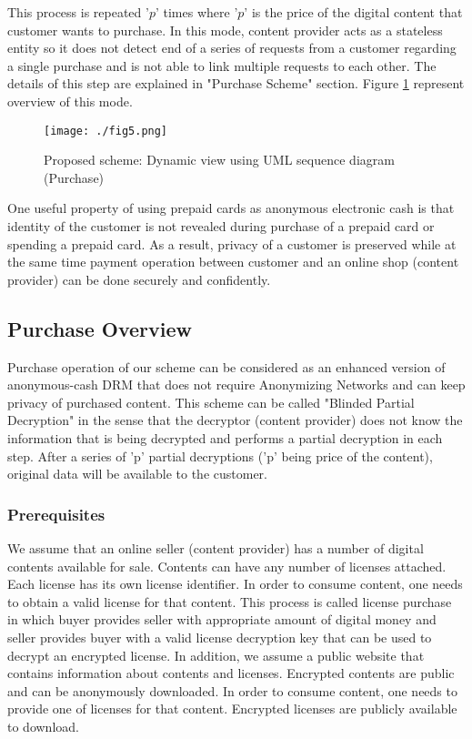 \documentclass[times]{secauth}
\begin{document}
This process is repeated '$p$' times where '$p$' is the price of the digital content that customer wants to purchase. In this mode, content provider acts as a stateless entity so it does not detect end of a series of requests from a customer regarding a single purchase and is not able to link multiple requests to each other. The details of this step are explained in "Purchase Scheme" section. Figure \ref{fig_dynamic} represent overview of this mode.

\begin{figure}
\centering
\texttt{[image: ./fig5.png]}
\caption{Proposed scheme: Dynamic view using UML sequence diagram (Purchase)}
\label{fig_dynamic}
\end{figure}

One useful property of using prepaid cards as anonymous electronic cash is that identity of the customer is not revealed during purchase of a prepaid card or spending a prepaid card. As a result, privacy of a customer is preserved while at the same time payment operation between customer and an online shop (content provider) can be done securely and confidently.

\subsection{Purchase Overview}
Purchase operation of our scheme can be considered as an enhanced version of anonymous-cash DRM that does not require Anonymizing Networks and can keep privacy of purchased content. This scheme can be called "Blinded Partial Decryption" in the sense that the decryptor (content provider) does not know the information that is being decrypted and performs a partial decryption in each step. After a series of 'p' partial decryptions ('p' being price of the content), original data will be available to the customer.

\subsubsection{Prerequisites}
We assume that an online seller (content provider) has a number of digital contents available for sale. Contents can have any number of licenses attached. Each license has its own license identifier. In order to consume content, one needs to obtain a valid license for that content. This process is called license purchase in which buyer provides seller with appropriate amount of digital money and seller provides buyer with a valid license decryption key that can be used to decrypt an encrypted license.
In addition, we assume a public website that contains information about contents and licenses. Encrypted contents are public and can be anonymously downloaded. In order to consume content, one needs to provide one of licenses for that content. Encrypted licenses are publicly available to download.
\end{document}
